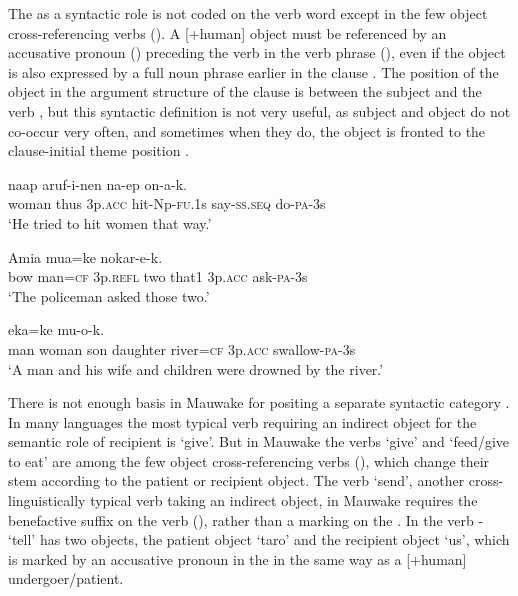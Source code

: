 The  as a syntactic role is not coded on the verb word except in the few object cross-referencing verbs (). A [+human] object must be referenced by an accusative pronoun () preceding the verb in the verb phrase (), even if the object is also expressed by a full noun phrase earlier in the clause . The position of the object  in the argument structure of the clause is between the subject and the verb , but this syntactic definition is not very useful, as subject and object do not co-occur very often, and sometimes when they do, the object is fronted to the clause-initial theme position . 

\ea%
\label{ex:5:x923}
\gll {}  naap    aruf-i-nen  na-ep  on-a-k. \\
     woman  thus  3p.\textsc{acc}  hit-Np-\textsc{fu}.1s  say-\textsc{ss}.\textsc{seq}  do-\textsc{pa}-3s \\
\glt `He tried to hit women that way.'
\z

\ea%
\label{ex:5:x924}
\gll Amia  mua=ke       nokar-e-k. \\
     bow  man=\textsc{cf}  3p.\textsc{refl}  two  that1  3p.\textsc{acc}  ask-\textsc{pa}-3s \\
\glt `The policeman asked those two.'
\z

\ea%
\label{ex:5:x925}
\gll {}     eka=ke    mu-o-k. \\
     man  woman  son  daughter  river=\textsc{cf}  3p.\textsc{acc}  swallow-\textsc{pa}-3s \\
\glt `A man and his wife and children were drowned by the river.'
\z

There is not enough basis in Mauwake for positing a separate syntactic category . In many languages the most typical verb requiring an indirect object for the semantic role of recipient is `give'.  But in Mauwake the verbs `give' and `feed/give to eat' are among the few object cross-referencing verbs (), which change their stem according to the patient or recipient object. The verb `send', another cross-linguistically typical verb taking an indirect object, in Mauwake requires the benefactive suffix on the verb (), rather than a marking on the .  In  the verb - `tell' has two objects, the patient object  `taro' and the recipient object  `us', which is marked by an accusative pronoun in the  in the same way as a [+human] undergoer/patient. 

